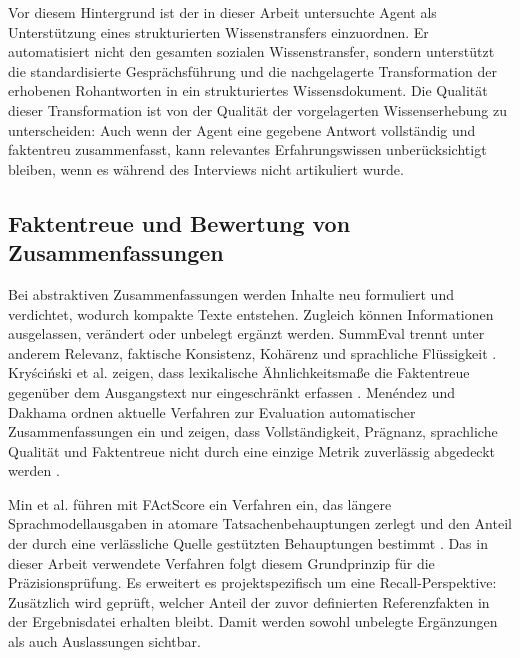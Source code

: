 \documentclass[
  10pt,
  ngerman,
  a4paper,
  toc=graduated,
  numbers=noenddot,
  headings=standardclasses,
  nonumberlist
]{scrartcl}
\begin{document}
Vor diesem Hintergrund ist der in dieser Arbeit untersuchte Agent als Unterstützung eines strukturierten Wissenstransfers einzuordnen. Er automatisiert nicht den gesamten sozialen Wissenstransfer, sondern unterstützt die standardisierte Gesprächsführung und die nachgelagerte Transformation der erhobenen Rohantworten in ein strukturiertes Wissensdokument. Die Qualität dieser Transformation ist von der Qualität der vorgelagerten Wissenserhebung zu unterscheiden: Auch wenn der Agent eine gegebene Antwort vollständig und faktentreu zusammenfasst, kann relevantes Erfahrungswissen unberücksichtigt bleiben, wenn es während des Interviews nicht artikuliert wurde.

\subsection{Faktentreue und Bewertung von Zusammenfassungen}

Bei abstraktiven Zusammenfassungen werden Inhalte neu formuliert und verdichtet, wodurch kompakte Texte entstehen. Zugleich können Informationen ausgelassen, verändert oder unbelegt ergänzt werden. SummEval trennt unter anderem Relevanz, faktische Konsistenz, Kohärenz und sprachliche Flüssigkeit 
\cite[S.~398]{fabbri2021}. Kryściński et al. zeigen, dass lexikalische Ähnlichkeitsmaße die Faktentreue gegenüber dem Ausgangstext nur eingeschränkt erfassen \cite[S.~9332]{kryscinski2020}. Menéndez und Dakhama ordnen aktuelle Verfahren zur Evaluation automatischer Zusammenfassungen ein und zeigen, dass Vollständigkeit, Prägnanz, sprachliche Qualität und Faktentreue nicht durch eine einzige Metrik zuverlässig abgedeckt werden \cite{menendez2024}.

Min et al. führen mit FActScore ein Verfahren ein, das längere Sprachmodellausgaben in atomare Tatsachenbehauptungen zerlegt und den Anteil der durch eine verlässliche Quelle gestützten Behauptungen bestimmt \cite[S.~12076]{min2023factscore}. Das in dieser Arbeit verwendete Verfahren folgt diesem Grundprinzip für die Präzisionsprüfung. Es erweitert es projektspezifisch um eine Recall-Perspektive: Zusätzlich wird geprüft, welcher Anteil der zuvor definierten Referenzfakten in der Ergebnisdatei erhalten bleibt. Damit werden sowohl unbelegte Ergänzungen als auch Auslassungen sichtbar.
\end{document}
